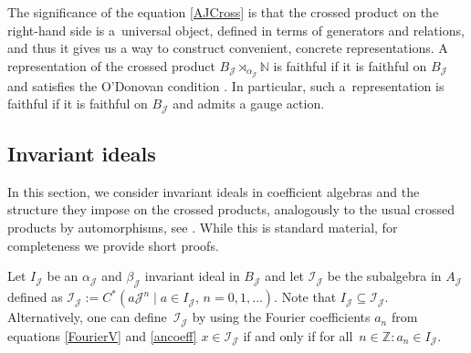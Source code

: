 \documentclass[10pt,a4paper]{amsart}
\newcommand{\N}{{\mathbb N}}
\newcommand{\Z}{{\mathbb Z}}
\newcommand{\jcal}{{\mathcal J}}
\newcommand{\fancyI}{\mathcal{I}}
\newcommand{\fancyJ}{\mathcal{J}}
\numberwithin{equation}{section}
\begin{document}
The significance of the equation \eqref{AJCross} is that the crossed product on the right-hand side is a~universal object, defined in terms of generators and relations, and thus it gives us a way to construct convenient, concrete representations. A representation of the crossed product ${B_\fancyJ \rtimes_{\alpha_\fancyJ} \N}$ is faithful if it is faithful on $B_\fancyJ$ and satisfies the O'Donovan condition \cite{BKR}. In particular, such a~representation is faithful if it is faithful on $B_\fancyJ$ and admits a gauge action.

\subsection{Invariant ideals}
 In this section, we consider invariant ideals in coefficient algebras and the structure they impose on the crossed products, analogously to the usual crossed products by automorphisms, see \cite[Section~3.4]{Williams}. While this is standard material, for completeness we provide short proofs.

Let $I_\mathcal{J}$ be an $\alpha_\jcal$ and $\beta_\jcal$ invariant ideal in $B_\mathcal{J}$ and let $\mathcal{I}_\jcal$ be the subalgebra in $A_\jcal$ defined as
$
\mathcal{I}_\jcal := C^*(a\jcal^n \mid a\in I_\jcal,\, n=0,1,\dots)$.
Note that $I_\fancyJ \subseteq \fancyI_\fancyJ$. Alternatively, one can define~$\mathcal{I}_\jcal$ by using the Fourier coefficients $a_n$ from equations \eqref{FourierV} and \eqref{ancoeff}
$
x\in \mathcal{I}_\jcal$ if and only if for all~${n\in\Z\colon a_n\in I_\mathcal{J}}$.
\end{document}
